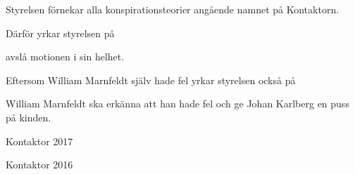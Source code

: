 \documentclass[../_main/handlingar.tex]{subfiles}
\begin{document}
\motionssvar

Styrelsen förnekar alla konspirationsteorier angående namnet på Kontaktorn.

Därför yrkar styrelsen på
\begin{attsatser}
    \att avslå motionen i sin helhet.
\end{attsatser}

Eftersom William Marnfeldt själv hade fel yrkar styrelsen också på
\begin{attsatser}
  \att William Marnfeldt ska erkänna att han hade fel och ge Johan Karlberg en puss på kinden.
\end{attsatser}

\begin{signatures}{2}
    \ist
    \signature{\sekr}{Kontaktor 2017}
    \signature{\ordf}{Kontaktor 2016}
\end{signatures}
\end{document}
